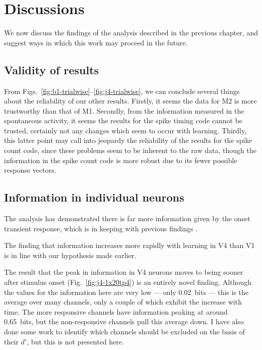 \section{Discussions}

We now discuss the findings of the analysis described in the previous chapter, and suggest ways in which this work may proceed in the future.

\subsection{Validity of results}

From Figs.~\ref{fig:b1-trialwise}--\ref{fig:j4-trialwise}, we can conclude several things about the reliability of our other results.
Firstly, it seems the data for \ac{M2} is more trustworthy than that of \ac{M1}.
Secondly, from the information measured in the spontaneous activity, it seems the results for the spike timing code cannot be trusted, certainly not any changes which seem to occur with learning.
Thirdly, this latter point may call into jeopardy the reliability of the results for the spike count code, since these problems seem to be inherent to the raw data, though the information in the spike count code is more robust due to its fewer possible response vectors.

\subsection{Information in individual neurons}

The analysis has demonstrated there is far more information given by the onset transient response, which is in keeping with previous findings \citep{Muller2001}.

The finding that information increases more rapidly with learning in \ac{V4} than \ac{V1} is in line with our hypothesis made earlier.

The result that the peak in information in \ac{V4} neurons moves to being sooner after stimulus onset (Fig.~\ref{fig:j4-1x20tp4}) is an entirely novel finding.
Although the values for the information here are very low --- only \SI{0.02}{bits} --- this is the average over many channels, only a couple of which exhibit the increase with time.
The more responsive channels have information peaking at around \SI{0.65}{bits}, but the non-responsive channels pull this average down.
I have also done some work to identify which channels should be excluded on the basis of their $d'$, but this is not presented here.


